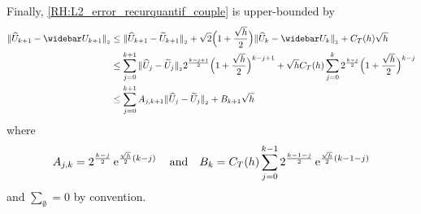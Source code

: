 Finally, \eqref{RH:L2_error_recurquantif_couple} is upper-bounded by
\begin{equation}
	\begin{aligned}
		\Vert \widehat U_{k+1} - \widebar U_{k+1} \Vert_{_2}
		 & \leq \Vert \widehat U_{k+1} - \widetilde U_{k+1} \Vert_{_2} + \sqrt{2} \Big( 1 + \frac{\sqrt{h}}{2} \Big) \Vert \widehat U_k - \widebar U_k \Vert_{_2} + C_{T} (h) \sqrt{h}                                                        \\
		 & \leq \sum_{j=0}^{k+1} \Vert \widehat U_j - \widetilde U_j \Vert_{_2} 2^{\frac{k-j+1}{2}} \Big( 1 + \frac{\sqrt{h}}{2} \Big)^{k-j+1} + \sqrt{h} C_{T} (h) \sum_{j=0}^{k} 2^{\frac{k-j}{2}} \Big( 1 + \frac{\sqrt{h}}{2} \Big)^{k-j} \\
		 & \leq \sum_{j=0}^{k+1} A_{j,k+1} \Vert \widehat U_j - \widetilde U_j \Vert_{_2} + B_{k+1} \sqrt{h}                                                                                                                                  \\
	\end{aligned}
\end{equation}
where
\begin{equation}
	A_{j,k} = 2^{\frac{k-j}{2}} \operatorname{e}^{\frac{\sqrt{h}}{2}(k-j)} \quad \mbox{and} \quad B_k = C_{T} (h) \sum_{j=0}^{k-1} 2^{\frac{k-1-j}{2}} \operatorname{e}^{\frac{\sqrt{h}}{2}(k-1-j)}
\end{equation}
and $\sum_{\emptyset} = 0$ by convention.

